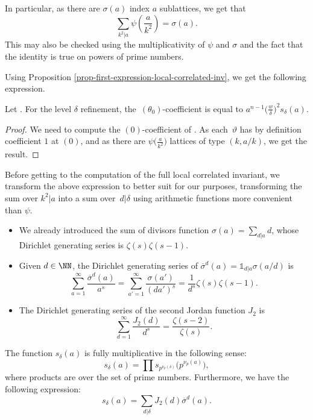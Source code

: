 \begin{remarkk}
In particular, as there are $\sigma(a)$ index $a$ sublattices, we get that
\[ \sum_{k^2|a}\psi\left(\frac{a}{k^2}\right)=\sigma(a). \]
This may also be checked using the multiplicativity of $\psi$ and $\sigma$ and the fact that the identity is true on powers of prime numbers.
\end{remarkk}

Using Proposition \ref{prop-first-expression-local-correlated-inv}, we get the following expression.

\begin{lem}
Let . For the level $\delta$ refinement, the~$(\theta_0)$-coefficient is equal to $a^{n-1}\bigl(\frac{w}{\delta}\bigr)^2s_\delta(a)$.
\end{lem}

\begin{proof}
We need to compute the $(0)$-coefficient of . As each~$\vartheta$ has by definition coefficient $1$ at $(0)$, and as there are $\psi\bigl(\frac{a}{k^2}\bigr)$ lattices of type $(k,a/k)$, we get the result.
\end{proof}

Before getting to the computation of the full local correlated invariant, we transform the above expression to better suit for our purposes, transforming the sum over $k^2|a$ into a sum over~$d|\delta$ using arithmetic functions more convenient than $\psi$.
\begin{itemize}\itemsep=0pt %
 \item We already introduced the sum of divisors function $\sigma(a)=\sum_{d|a}d$, whose Dirichlet generating series is $\zeta(s)\zeta(s-1)$.
 \item Given $d\in\NN$, the Dirichlet generating series of $\overline{\sigma}^d(a)=\mathds{1}_{d|a}\sigma(a/d)$ is
\[ \sum_{a=1}^\infty \frac{\overline{\sigma}^d(a)}{a^s} = \sum_{a'=1}^\infty \frac{\sigma(a')}{(da')^s}=\frac{1}{d^s}\zeta(s)\zeta(s-1). \]
 \item The Dirichlet generating series of the second Jordan function $J_2$ is
\[ \sum_{d=1}^\infty \frac{J_2(d)}{d^s}=\frac{\zeta(s-2)}{\zeta(s)}. \]
\end{itemize}

\begin{lem}
The function $s_\delta(a)$ is fully multiplicative in the following sense:
\[ s_\delta(a)=\prod s_{p^{\nu_p(\delta)}}\bigl(p^{\nu_p(a)}\bigr), \]
where products are over the set of prime numbers. Furthermore, we have the following expression:
\[ s_\delta(a)=\sum_{d|\delta} J_2(d)\overline{\sigma}^d(a). \]
\end{lem}


